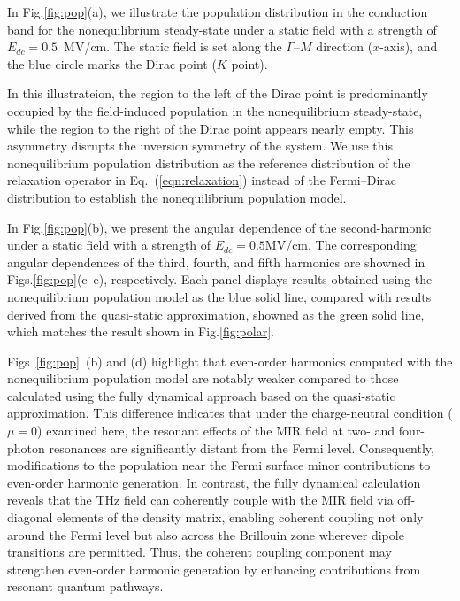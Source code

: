 In Fig.\ref{fig:pop}(a), we illustrate the population distribution in the conduction band for the nonequilibrium steady-state under a static field with a strength of $E_{dc}=0.5$~MV/cm. The static field is set along the $\Gamma$--$M$ direction ($x$-axis), and the blue circle marks the Dirac point ($K$ point).

In this illustrateion, the region to the left of the Dirac point is predominantly occupied by the field-induced population in the nonequilibrium steady-state, while the region to the right of the Dirac point appears nearly empty. This asymmetry disrupts the inversion symmetry of the system. We use this nonequilibrium population distribution as the reference distribution of the relaxation operator in Eq.~(\ref{eqn:relaxation}) instead of the Fermi--Dirac distribution to establish the nonequilibrium population model.

In Fig.\ref{fig:pop}(b), we present the angular dependence of the second-harmonic  under a static field with a strength of $E_{dc}=0.5$MV/cm. The corresponding angular dependences of the third, fourth, and fifth harmonics are showned in Figs.\ref{fig:pop}(c--e), respectively. Each panel displays results obtained using the nonequilibrium population model as the blue solid line, compared with results derived from the quasi-static approximation, showned as the green solid line, which matches the result shown in Fig.\ref{fig:polar}.

Figs~\ref{fig:pop}~(b) and (d) highlight that even-order harmonics computed with the nonequilibrium population model are notably weaker compared to those calculated using the fully dynamical approach based on the quasi-static approximation. This difference indicates that under the charge-neutral condition ($\mu=0$) examined here, the resonant effects of the MIR field at two- and four-photon resonances are significantly distant from the Fermi level. Consequently, modifications to the population near the Fermi surface  minor contributions to even-order harmonic generation. In contrast, the fully dynamical calculation reveals that the THz field can coherently couple with the MIR field via off-diagonal elements of the density matrix, enabling coherent coupling not only around the Fermi level but also across the Brillouin zone wherever dipole transitions are permitted. Thus, the coherent coupling component may strengthen even-order harmonic generation by enhancing contributions from resonant quantum pathways.

